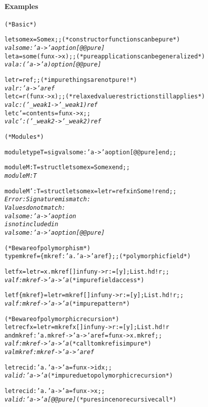 \documentclass[a4paper]{article}
\let\type\textit
\newcommand\cmt[1]{\hfill{(* #1 *)}}
\begin{document}
\paragraph{Examples}
\begin{alltt}
(* Basic *)

let some x = Some x;; \cmt{constructor functions can be pure}
\type{val some : 'a -> 'a option [@@pure]}
let a = some (fun x -> x);; \cmt{pure applications can be generalized}
\type{val a : ('a -> 'a) option [@@pure]}

let r = ref;; \cmt{impure things are not pure!}
\type{val r : 'a -> 'a ref}
let c = r (fun x -> x);; \cmt{relaxed value restriction still applies}
\type{val c : ('_weak1 -> '_weak1) ref}
let c' = {contents=fun x -> x};;
\type{val c' : ('_weak2 -> '_weak2) ref}

(* Modules *)

module type T = sig val some : 'a -> 'a option [@@pure] end;;

module M : T = struct let some x = Some x end;;
\type{module M : T}

module M' : T = struct let some x = let r = ref x in Some !r end;;
\type{Error: Signature mismatch:
       Values do not match:
         val some : 'a -> 'a option
       is not included in
         val some : 'a -> 'a option [@@pure]}

(* Beware of polymorphism *)
type mkref = \{mkref: 'a. 'a -> 'a ref\};; \cmt{polymorphic field}

let f x = let r = x.mkref [] in fun y -> r := [y]; List.hd !r;;
\type{val f : mkref -> 'a -> 'a} \cmt{impure field access}

let f \{mkref\} = let r = mkref [] in fun y -> r := [y]; List.hd !r;;
\type{val f : mkref -> 'a -> 'a} \cmt{impure pattern}

(* Beware of polymorphic recursion *)
let rec f x = let r = mkref x [] in fun y -> r := [y]; List.hd !r
and mkref : 'a. mkref -> 'a -> 'a ref = fun x -> x.mkref;;
\type{val f : mkref -> 'a -> 'a} \cmt{call to mkref is impure}
\type{val mkref : mkref -> 'a -> 'a ref}

let rec id : 'a. 'a -> 'a = fun x -> id x;;
\type{val id : 'a -> 'a} \cmt{impure due to polymorphic recursion}

let rec id : 'a. 'a -> 'a = fun x -> x;;
\type{val id : 'a -> 'a [@@pure]} \cmt{pure since no recursive call}
\end{alltt}
\end{document}
